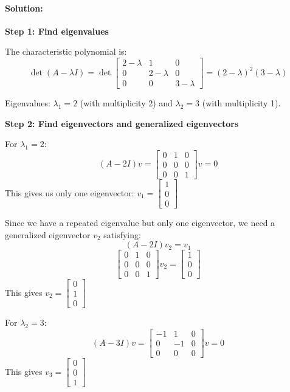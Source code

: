 \documentclass[11pt,a4paper]{article}
\begin{document}
\paragraph{Solution:}

\textbf{Step 1: Find eigenvalues}

The characteristic polynomial is:
\[
\det(A - \lambda I) = \det\begin{bmatrix} 2-\lambda & 1 & 0 \\ 0 & 2-\lambda & 0 \\ 0 & 0 & 3-\lambda \end{bmatrix} = (2-\lambda)^2(3-\lambda)
\]

Eigenvalues: $\lambda_1 = 2$ (with multiplicity 2) and $\lambda_2 = 3$ (with multiplicity 1).

\textbf{Step 2: Find eigenvectors and generalized eigenvectors}

For $\lambda_1 = 2$:
\[
(A - 2I)v = \begin{bmatrix} 0 & 1 & 0 \\ 0 & 0 & 0 \\ 0 & 0 & 1 \end{bmatrix}v = 0
\]
This gives us only one eigenvector: $v_1 = \begin{bmatrix} 1 \\ 0 \\ 0 \end{bmatrix}$

Since we have a repeated eigenvalue but only one eigenvector, we need a generalized eigenvector $v_2$ satisfying:
\[
(A - 2I)v_2 = v_1
\]
\[
\begin{bmatrix} 0 & 1 & 0 \\ 0 & 0 & 0 \\ 0 & 0 & 1 \end{bmatrix}v_2 = \begin{bmatrix} 1 \\ 0 \\ 0 \end{bmatrix}
\]
This gives $v_2 = \begin{bmatrix} 0 \\ 1 \\ 0 \end{bmatrix}$

For $\lambda_2 = 3$:
\[
(A - 3I)v = \begin{bmatrix} -1 & 1 & 0 \\ 0 & -1 & 0 \\ 0 & 0 & 0 \end{bmatrix}v = 0
\]
This gives $v_3 = \begin{bmatrix} 0 \\ 0 \\ 1 \end{bmatrix}$
\end{document}
